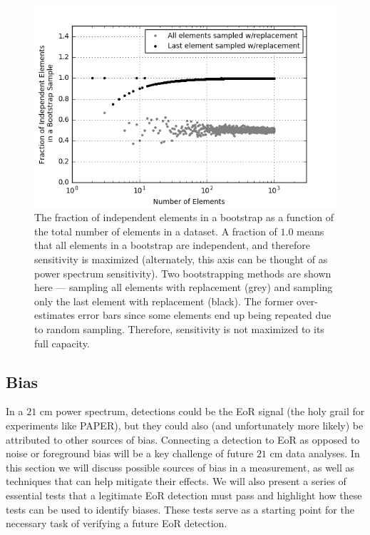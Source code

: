 \documentclass[preprint2,numberedappendix,tighten]{aastex6}  %
\begin{document}
\begin{figure}
	\centering
	\includegraphics[trim={0.3cm 0.3cm 0.3cm 0.3cm},width=\columnwidth]{plots/toy_error2.png}
	\caption{The fraction of independent elements in a bootstrap as a function of the total number of elements in a dataset. A fraction of $1.0$ means that all elements in a bootstrap are independent, and therefore sensitivity is maximized (alternately, this axis can be thought of as power spectrum sensitivity). Two bootstrapping methods are shown here --- sampling all elements with replacement (grey) and sampling only the last element with replacement (black). The former over-estimates error bars since some elements end up being repeated due to random sampling. Therefore, sensitivity is not maximized to its full capacity.}
	\label{fig:toy_error2}
\end{figure}


\subsection{Bias}
\label{sec:BiasOverview}

In a $21$ cm power spectrum, detections could be the EoR signal (the holy grail for experiments like PAPER), but they could also (and unfortunately more likely) be attributed to other sources of bias. Connecting a detection to EoR as opposed to noise or foreground bias will be a key challenge of future $21$ cm data analyses. In this section we will discuss possible sources of bias in a measurement, as well as techniques that can help mitigate their effects. We will also present a series of essential tests that a legitimate EoR detection must pass and highlight how these tests can be used to identify biases. These tests serve as a starting point for the necessary task of verifying a future EoR detection.
\end{document}
